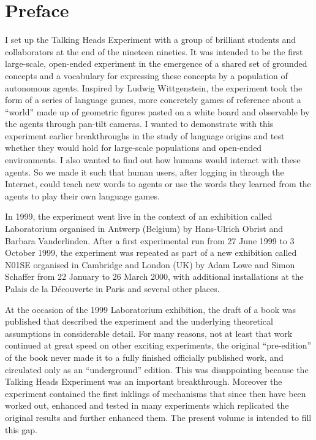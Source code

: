 \chapter*{Preface}

I set up the Talking Heads Experiment with a group of brilliant students and collaborators at the end of the nineteen nineties. It was intended to be the first large-scale, open-ended experiment in the emergence of a shared set of grounded concepts and a vocabulary for expressing these concepts by a population of autonomous agents. Inspired by Ludwig Wittgenstein, the experiment took the form of a series of language games, more concretely games of reference about a ``world'' made up of geometric figures pasted on a white board and observable by the agents through pan-tilt cameras. 
I  wanted to demonstrate with this experiment earlier breakthroughs in the study of language origins and 
test whether they would hold for large-scale populations and open-ended environments. I also wanted to find 
out how humans would interact with these agents. So we made it such that human users, after logging in through the 
Internet, could teach new words to agents or use the words they learned from the agents to play their own language games. 

In 1999, the experiment went live in the context of an exhibition called Laboratorium organised in 
Antwerp (Belgium) by Hans-Ulrich Obrist and Barbara Vanderlinden. After a first experimental run from 27 June 1999 to 
3 October 1999, the experiment was repeated as part of a new exhibition called N01SE organised in Cambridge and 
London (UK) by Adam Lowe and Simon Schaffer from 22 January to 26 March 2000, with additional installations at 
the Palais de la D\'{e}couverte in Paris and several other places. 

At the occasion of the 1999 Laboratorium exhibition, the draft of a book was published 
that described the experiment and the underlying theoretical assumptions in considerable detail. 
For many reasons, not at least 
that work continued at great speed on other exciting experiments, the original ``pre-edition'' of the
book never made it to a fully finished officially 
published work, and circulated only as an ``underground'' edition. 
This was disappointing because the Talking Heads Experiment was an important breakthrough. 
Moreover the experiment contained the first inklings of mechanisms that since 
then have been worked out, enhanced and tested in many experiments which replicated the original results and further
enhanced them. The present volume is intended to fill this gap. 

